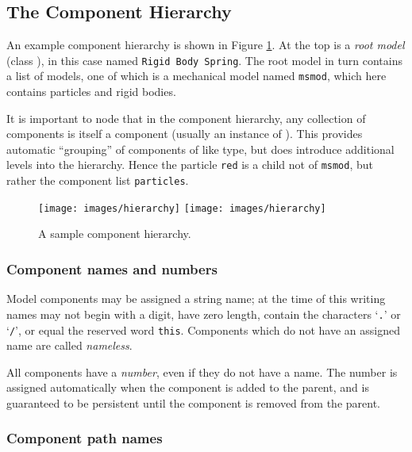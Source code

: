 \documentclass{article}
\begin{document}
\subsection{The Component Hierarchy}
\label{hierarchySec}

An example component hierarchy is shown in Figure
\ref{hierarchyFig}. At the top is a {\it root model} (class
), 
in this case named {\tt Rigid Body Spring}.  The
root model in turn contains a list of models, one of which is a
mechanical model named {\tt msmod}, which here contains particles and
rigid bodies.

It is important to node that in the component hierarchy, any collection
of components is itself a component (usually an instance of
). 
This provides automatic ``grouping'' of
components of like type, but does introduce additional levels into the
hierarchy. Hence the particle {\tt red} is a child not of {\tt msmod},
but rather the component list {\tt particles}.

\begin{figure}
\begin{center}
\iflatexml
\texttt{[image: images/hierarchy]}
\else
\texttt{[image: images/hierarchy]}
\fi
\end{center}
\caption{A sample component hierarchy.}%
\label{hierarchyFig}
\end{figure}

\subsubsection{Component names and numbers}

Model components may be assigned a string name; at the time of
this writing names may not begin with a digit, have zero length, contain
the characters `{\tt .}' or `{\tt /}', or equal the reserved word {\tt this}.
Components which do not have an assigned name are
called {\it nameless}.

All components have a {\it number}, even if they do not have a name. The
number is assigned automatically when the component is added to the
parent, and is guaranteed to be persistent until the component is
removed from the parent.

\subsubsection{Component path names}
\label{pathNamesSec}
\end{document}
